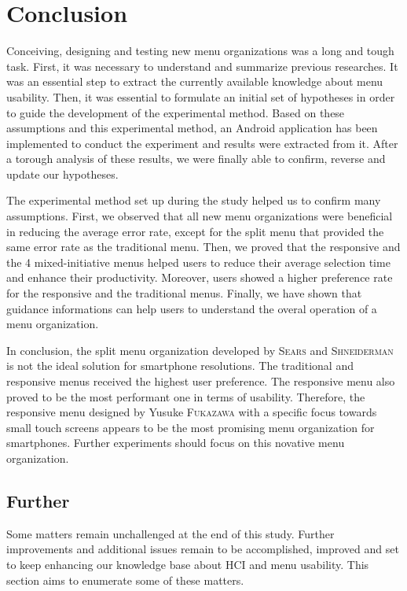 \chapter{Conclusion}
Conceiving, designing and testing new menu organizations was a long and tough 
task. First, it was necessary to understand and summarize previous researches. 
It was an essential step to extract the currently available knowledge about 
menu usability. Then, it was essential to formulate an initial set of 
hypotheses in order to guide the development of the experimental method. 
Based on these assumptions and this experimental method, an Android application 
has been
implemented to conduct the experiment and results were extracted from it. After 
a torough analysis of these results, we were finally able to confirm, reverse 
and update our hypotheses.\newline

The experimental method set up during the study helped us to confirm many 
assumptions. First, we observed that all new menu organizations were beneficial 
in reducing the average error rate, except for the split menu that provided 
the same error rate as the traditional menu. Then, we proved that the 
responsive and the 4 mixed-initiative menus helped users to reduce their average 
selection time and enhance their productivity. Moreover, users showed a higher 
preference rate for the responsive and the traditional menus. Finally, we 
have shown that guidance informations can help users to understand the overal 
operation of a menu organization.\newline

In conclusion, the split menu organization developed by \textsc{Sears} and 
\textsc{Shneiderman} is not the ideal solution for smartphone resolutions. The 
traditional and responsive menus received the highest user preference. The 
responsive menu also proved to be the most performant one in terms of 
usability. Therefore, the responsive menu designed by Yusuke \textsc{Fukazawa} 
with a specific focus towards small touch screens appears to be the most 
promising menu organization for smartphones. Further experiments should focus 
on this novative menu organization.

\section{Further}
Some matters remain unchallenged at the end of this study. Further 
improvements and additional issues remain to be accomplished, improved and 
set to keep enhancing our knowledge base about HCI and menu usability. This 
section aims to enumerate some of these matters.

